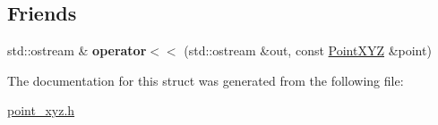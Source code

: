 \subsection*{Friends}
\begin{DoxyCompactItemize}
\item 
\hypertarget{structquanergy_1_1PointXYZ_a730340bef93611db89eb2756273637ae}{std\-::ostream \& {\bfseries operator$<$$<$} (std\-::ostream \&out, const \hyperlink{structquanergy_1_1PointXYZ}{Point\-X\-Y\-Z} \&point)}\label{structquanergy_1_1PointXYZ_a730340bef93611db89eb2756273637ae}

\end{DoxyCompactItemize}


The documentation for this struct was generated from the following file\-:\begin{DoxyCompactItemize}
\item 
\hyperlink{point__xyz_8h}{point\-\_\-xyz.\-h}\end{DoxyCompactItemize}
